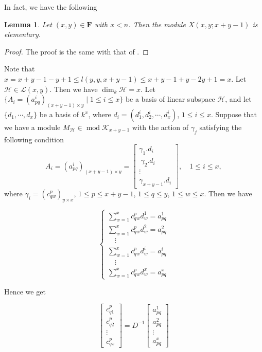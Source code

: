 \documentclass[a4paper,12pt]{amsart}
\newcommand{\cH}{\mathcal{H}}
\newcommand{\cL}{\mathcal{L}}
\newcommand{\cK}{\mathcal{K}}
\DeclareMathOperator{\modd}{mod}
\newtheorem{Lemma}[proposition]{Lemma}
\begin{document}
In fact, we have the following 


\begin{Lemma}\label{theorem}
Let   $(x,y)\in \mathbf{F}$ with $x<n$. Then the module $X(x,y;x+y-1)$ is elementary.

\end{Lemma}
\begin{proof}
The proof is the same with that of \cite[Lemma 4.1]{jie}.
\end{proof}




Note that $x=x+y-1-y+1\leq l(y,y,x+y-1)\leq x+y-1+y-2y+1=x$. Let $\cH\in \cL(x,y)$. Then we have $\dim_k \cH=x$.  Let $\{A_i=(a^i_{pq})_{(x+y-1)\times y}\mid 1\leq i\leq x\}$ be a  basis of linear subspace $\cH$, and let $\{d_1,\cdots,d_x\}$ be a  basis of $k^x$, where $d_i=(d^i_1, d^i_2,\cdots,d^i_x)$, $1\leq i\leq x$.  Suppose that we have a module $M_{\cH}\in \modd\cK_{x+y-1}$ with the action of $\gamma_j$ satisfying the following condition
\[ A_{i}=(a^i_{pq})_{(x+y-1)\times y}=\begin{bmatrix}
\gamma_1.d_i\\\
\gamma_2.d_i\\
\vdots\\
\gamma_{x+y-1}.d_i
\end{bmatrix}, \quad 1\leq i\leq x, \]
where $\gamma_i=(c^p_{qw})_{y\times x}$, $1\leq p \leq x+y-1$, $1\leq q\leq y$, $1\leq w\leq x$. Then we have 


\[\begin{cases}
\sum^x_{w=1}c^p_{qw}d^1_w=a^1_{pq} \\
\sum^x_{w=1}c^p_{qw}d^2_w=a^2_{pq}\\
   \quad \vdots\\
\sum^x_{w=1}c^p_{qw}d^i_w=a^i_{pq} \\
  \quad  \vdots\\
\sum^x_{w=1}c^{p}_{qw}d^x_w=a^{x}_{pq} 
\end{cases}\]

Hence we get 


\[ \begin{bmatrix}
c^p_{q1}\\[5pt]

c^{p}_{q2}\\[5pt]

\vdots\\[5pt]

c^p_{qx}
\end{bmatrix}= D^{-1}\begin{bmatrix}
a^1_{pq}\\[5pt]
a^{2}_{pq}\\[5pt]
\vdots\\[5pt]
a^x_{pq}
\end{bmatrix} \]
\end{document}
